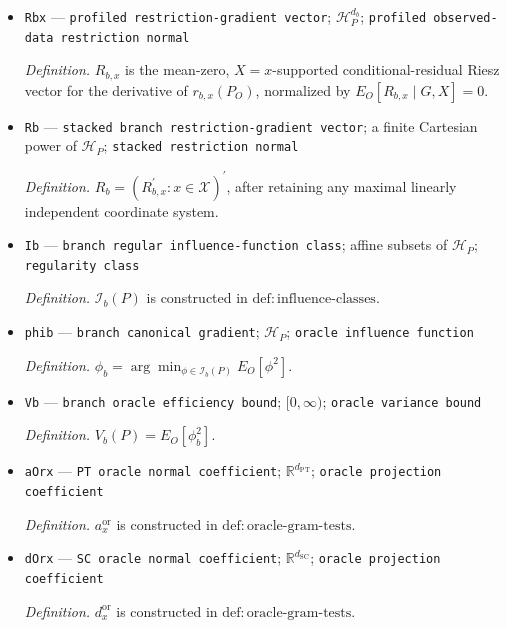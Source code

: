 \documentclass{article}
\begin{document}
\begin{itemize}
  \par\smallskip\noindent\emph{Definition.} \(\mathcal T_b(P)\) is constructed in \(\mathrm{def{:}branch\text{-}tangents}\).
  \item \texttt{Rbx} --- \texttt{profiled restriction-\allowbreak{}gradient vector}; \(\mathcal H_P^{d_b}\); \texttt{profiled observed-\allowbreak{}data restriction normal}
  \par\smallskip\noindent\emph{Definition.} \(R_{b,x}\) is the mean-zero, \(X=x\)-supported conditional-residual Riesz vector for the derivative of \(r_{b,x}(P_O)\), normalized by \(E_O[R_{b,x}\mid G,X]=0\).
  \item \texttt{Rb} --- \texttt{stacked branch restriction-\allowbreak{}gradient vector}; a finite Cartesian power of \(\mathcal H_P\); \texttt{stacked restriction normal}
  \par\smallskip\noindent\emph{Definition.} \(R_b=(R_{b,x}^{\prime}:x\in\mathcal X)^{\prime}\), after retaining any maximal linearly independent coordinate system.
  \item \texttt{Ib} --- \texttt{branch regular influence-\allowbreak{}function class}; affine subsets of \(\mathcal H_P\); \texttt{regularity class}
  \par\smallskip\noindent\emph{Definition.} \(\mathcal I_b(P)\) is constructed in \(\mathrm{def{:}influence\text{-}classes}\).
  \item \texttt{phib} --- \texttt{branch canonical gradient}; \(\mathcal H_P\); \texttt{oracle influence function}
  \par\smallskip\noindent\emph{Definition.} \(\phi_b=\arg\min_{\phi\in\mathcal I_b(P)}E_O[\phi^2]\).
  \item \texttt{Vb} --- \texttt{branch oracle efficiency bound}; \([0,\infty)\); \texttt{oracle variance bound}
  \par\smallskip\noindent\emph{Definition.} \(V_b(P)=E_O[\phi_b^2]\).
  \item \texttt{aOrx} --- \texttt{PT oracle normal coefficient}; \(\mathbb R^{d_{\mathrm{PT}}}\); \texttt{oracle projection coefficient}
  \par\smallskip\noindent\emph{Definition.} \(a_x^{\mathrm{or}}\) is constructed in \(\mathrm{def{:}oracle\text{-}gram\text{-}tests}\).
  \item \texttt{dOrx} --- \texttt{SC oracle normal coefficient}; \(\mathbb R^{d_{\mathrm{SC}}}\); \texttt{oracle projection coefficient}
  \par\smallskip\noindent\emph{Definition.} \(d_x^{\mathrm{or}}\) is constructed in \(\mathrm{def{:}oracle\text{-}gram\text{-}tests}\).

\end{itemize}
\end{document}
